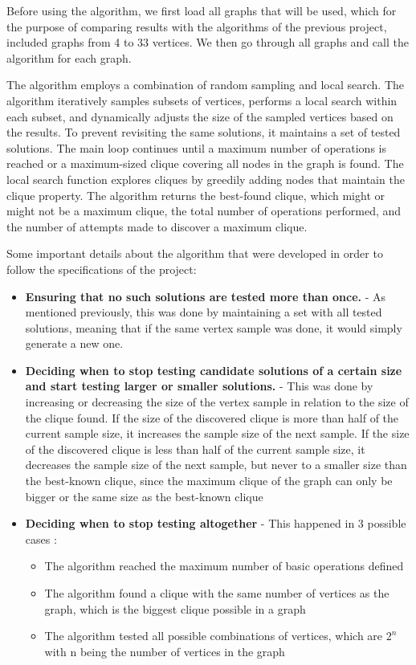 \documentclass[]{revdetua}
\begin{document}
Before using the algorithm, we first load all graphs that will be used, which for the purpose of comparing results with the algorithms of the previous project, included graphs from 4 to 33 vertices. We then go through all graphs and call the algorithm for each graph.

The algorithm employs a combination of random sampling and local search. The algorithm iteratively samples subsets of vertices, performs a local search within each subset, and dynamically adjusts the size of the sampled vertices based on the results. To prevent revisiting the same solutions, it maintains a set of tested solutions. The main loop continues until a maximum number of operations is reached or a maximum-sized clique covering all nodes in the graph is found. The local search function explores cliques by greedily adding nodes that maintain the clique property. The algorithm returns the best-found clique, which might or might not be a maximum clique, the total number of operations performed, and the number of attempts made to discover a maximum clique.

Some important details about the algorithm that were developed in order to follow the specifications of the project:
\begin{itemize}
    \item \textbf{Ensuring that no such solutions are tested more than once.} - As mentioned previously, this was done by maintaining a set with all tested solutions, meaning that if the same vertex sample was done, it would simply generate a new one.
    \item \textbf{Deciding when to stop testing candidate solutions of a certain size and start testing larger or smaller solutions.} - This was done by increasing or decreasing the size of the vertex sample in relation to the size of the clique found. If the size of the discovered clique is more than half of the current sample size, it increases the sample size of the next sample. If the size of the discovered clique is less than half of the current sample size, it decreases the sample size of the next sample, but never to a smaller size than the best-known clique, since the maximum clique of the graph can only be bigger or the same size as the best-known clique
    \item \textbf{Deciding when to stop testing altogether} - This happened in 3 possible cases :
        \begin{itemize}
            \item The algorithm reached the maximum number of basic operations defined
            \item The algorithm found a clique with the same number of vertices as the graph, which is the biggest clique possible in a graph
            \item The algorithm tested all possible combinations of vertices, which are \( 2^n \) with n being the number of vertices in the graph
        \end{itemize}
\end{itemize}
\end{document}
